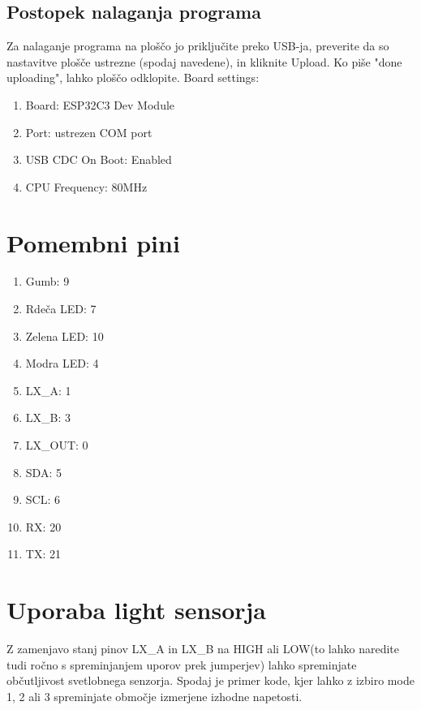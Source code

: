 \subsection{Postopek nalaganja programa}
Za nalaganje programa na ploščo jo priključite preko USB-ja, preverite da so nastavitve plošče ustrezne (spodaj navedene), in kliknite Upload. Ko piše "done uploading", lahko ploščo odklopite.
Board settings: 
\begin{enumerate}
    \item Board: ESP32C3 Dev Module
    \item Port: ustrezen COM port
    \item USB CDC On Boot: Enabled 
    \item CPU Frequency: 80MHz
\end{enumerate}

\section{Pomembni pini}
\begin{enumerate}
    \item Gumb: 9
    \item Rdeča LED: 7
    \item Zelena LED: 10
    \item Modra LED: 4
    \item LX\_A: 1
    \item LX\_B: 3
    \item LX\_OUT: 0
    \item SDA: 5
    \item SCL: 6
    \item RX: 20
    \item TX: 21
\end{enumerate}

\section{Uporaba light sensorja}
Z zamenjavo stanj pinov LX\_A in LX\_B na HIGH ali LOW(to lahko naredite tudi ročno s spreminjanjem uporov prek jumperjev) lahko spreminjate občutljivost svetlobnega senzorja. Spodaj je primer kode, kjer lahko z izbiro mode 1, 2 ali 3 spreminjate območje izmerjene izhodne napetosti.

